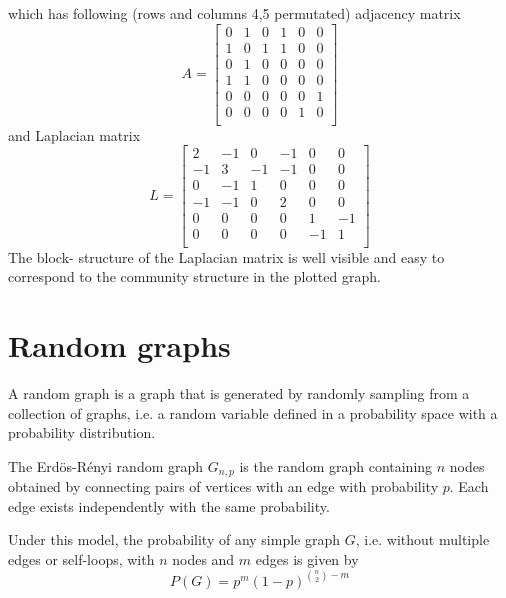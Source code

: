 which has following (rows and columns 4,5 permutated) adjacency matrix
$$
A = \begin{bmatrix}
  0 & 1 & 0 & 1 & 0 & 0\\
  1 & 0 & 1 & 1 & 0 & 0\\
  0 & 1 & 0 & 0 & 0 & 0\\
  1 & 1 & 0 & 0 & 0 & 0\\
  0 & 0 & 0 & 0 & 0 & 1\\
  0 & 0 & 0 & 0 & 1 & 0\\
\end{bmatrix}
$$
\noindent and Laplacian matrix
$$
L = \begin{bmatrix}
  2 & -1 & 0 & -1 & 0 & 0\\
  -1 & 3 & -1 & -1 & 0 & 0\\
  0 & -1 & 1 & 0 & 0 & 0\\
  -1 & -1 & 0 & 2 & 0 & 0\\
  0 & 0 & 0 & 0 & 1 & -1\\
  0 & 0 & 0 & 0 & -1 & 1\\
\end{bmatrix}
$$
The block- structure of the Laplacian matrix is well visible and easy to correspond to the community structure in the plotted graph.



\section{Random graphs} %
\label{sec:random_graph_model}

A random graph is a graph that is generated by randomly sampling from a collection of graphs, i.e. a random variable defined in a probability space with a probability distribution.
\begin{definition}
The Erd\"os-R\'enyi random graph $G_{n, p}$ is the random graph containing $n$ nodes obtained by connecting pairs of vertices with an edge with probability $p$. Each edge exists independently with the same probability.
\end{definition}
Under this model, the probability of any simple graph $G$, i.e. without multiple edges or self-loops, with $n$ nodes and $m$ edges is given by
$$P(G) = p^m (1-p)^{\binom{n}{2} - m}$$


